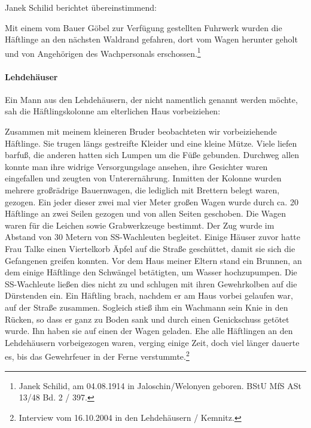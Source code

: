 Janek Schilid berichtet übereinstimmend:
\begin{leftbar}
Mit einem vom Bauer Göbel zur Verfügung gestellten Fuhrwerk wurden die Häftlinge an den nächsten Waldrand gefahren, dort vom Wagen herunter geholt und von Angehörigen des Wachpersonals erschossen.\footnote{Janek Schilid, am 04.08.1914 in Jaloschin/Welonyen geboren. BStU MfS ASt 13/48 Bd. 2 / 397.}
\end{leftbar}

\newpage
\paragraph{Lehdehäuser}
Ein Mann aus den Lehdehäusern, der nicht namentlich genannt werden möchte, sah die Häftlingskolonne am elterlichen Haus vorbeiziehen:
\begin{leftbar} 
Zusammen mit meinem kleineren Bruder beobachteten wir vorbeiziehende Häftlinge. Sie trugen längs gestreifte Kleider und eine kleine Mütze. Viele liefen barfuß, die anderen hatten sich Lumpen um die Füße gebunden. Durchweg allen konnte man ihre widrige Versorgungslage ansehen, ihre Gesichter waren eingefallen und zeugten von Unterernährung. Inmitten der Kolonne wurden mehrere großrädrige Bauernwagen, die lediglich mit Brettern belegt waren, gezogen. Ein jeder dieser zwei mal vier Meter großen Wagen wurde durch ca. 20 Häftlinge an zwei Seilen gezogen und von allen Seiten geschoben. Die Wagen waren für die Leichen sowie Grabwerkzeuge bestimmt. Der Zug wurde im Abstand von 30 Metern von SS-Wachleuten begleitet.\newline
Einige Häuser zuvor hatte Frau Talke einen Viertelkorb Äpfel auf die Straße geschüttet, damit sie sich die Gefangenen greifen konnten. Vor dem Haus meiner Eltern stand ein Brunnen, an dem einige Häftlinge den Schwängel betätigten, um Wasser hochzupumpen. Die SS-Wachleute ließen dies nicht zu und schlugen mit ihren Gewehrkolben auf die Dürstenden ein. Ein Häftling brach, nachdem er am Haus vorbei gelaufen war, auf der Straße zusammen. Sogleich stieß ihm ein Wachmann sein Knie in den Rücken, so dass er ganz zu Boden sank und durch einen Genickschuss getötet wurde. Ihn haben sie auf einen der Wagen geladen. Ehe alle Häftlingen an den Lehdehäusern vorbeigezogen waren, verging einige Zeit, doch viel länger dauerte es, bis das Gewehrfeuer in der Ferne verstummte.\footnote{Interview vom 16.10.2004 in den Lehdehäusern / Kemnitz.}
\end{leftbar}

